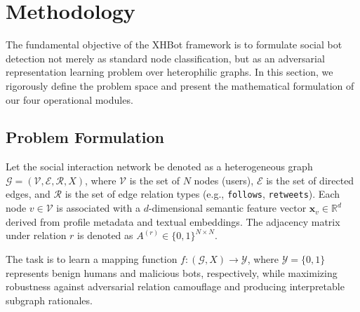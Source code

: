 \section{Methodology}

The fundamental objective of the XHBot framework is to formulate social bot detection not merely as standard node classification, but as an adversarial representation learning problem over heterophilic graphs. In this section, we rigorously define the problem space and present the mathematical formulation of our four operational modules.

\subsection{Problem Formulation}
Let the social interaction network be denoted as a heterogeneous graph $\mathcal{G} = (\mathcal{V}, \mathcal{E}, \mathcal{R}, X)$, where $\mathcal{V}$ is the set of $N$ nodes (users), $\mathcal{E}$ is the set of directed edges, and $\mathcal{R}$ is the set of edge relation types (e.g., \texttt{follows}, \texttt{retweets}). Each node $v \in \mathcal{V}$ is associated with a $d$-dimensional semantic feature vector $\mathbf{x}_v \in \mathbb{R}^d$ derived from profile metadata and textual embeddings. The adjacency matrix under relation $r$ is denoted as $A^{(r)} \in \{0, 1\}^{N \times N}$. 

The task is to learn a mapping function $f: (\mathcal{G}, X) \rightarrow \mathcal{Y}$, where $\mathcal{Y} = \{0, 1\}$ represents benign humans and malicious bots, respectively, while maximizing robustness against adversarial relation camouflage and producing interpretable subgraph rationales.

